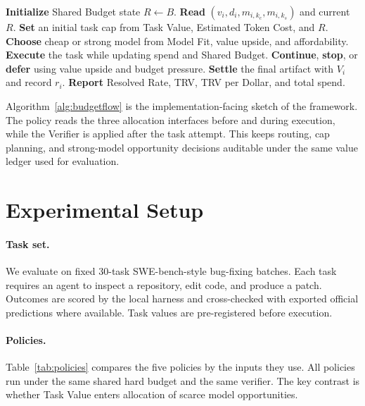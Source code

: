 \documentclass{article}
\newcommand{\trv}{TRV\xspace}
\newcommand{\taskvalue}{Task Value\xspace}
\newcommand{\tokencost}{Estimated Token Cost\xspace}
\newcommand{\modelfit}{Model Fit\xspace}
\newcommand{\sharedbudget}{Shared Budget\xspace}
\newcommand{\verifier}{Verifier\xspace}
\begin{document}
\begin{algorithm}[t]
\caption{BudgetFlow batch policy sketch}
\label{alg:budgetflow}
\begin{algorithmic}[1]
\STATE \textbf{Initialize} \sharedbudget state $R \leftarrow B$.
    \STATE \textbf{Read} $(v_i,d_i,m_{i,k_c},m_{i,k_s})$ and current $R$.
    \STATE \textbf{Set} an initial task cap from \taskvalue, \tokencost, and $R$.
    \STATE \textbf{Choose} cheap or strong model from \modelfit, value upside, and affordability.
    \STATE \textbf{Execute} the task while updating spend and \sharedbudget.
    \STATE \textbf{Continue}, \textbf{stop}, or \textbf{defer} using value upside and budget pressure.
    \STATE \textbf{Settle} the final artifact with $V_i$ and record $r_i$.
\ENDFOR
\STATE \textbf{Report} Resolved Rate, \trv, \trv per Dollar, and total spend.
\end{algorithmic}
\end{algorithm}

Algorithm~\ref{alg:budgetflow} is the implementation-facing sketch of the framework. The policy reads the three allocation interfaces before and during execution, while the \verifier is applied after the task attempt. This keeps routing, cap planning, and strong-model opportunity decisions auditable under the same value ledger used for evaluation.

\section{Experimental Setup}
\label{sec:setup}
\paragraph{Task set.}
We evaluate on fixed 30-task SWE-bench-style bug-fixing batches. Each task requires an agent to inspect a repository, edit code, and produce a patch. Outcomes are scored by the local harness and cross-checked with exported official predictions where available. Task values are pre-registered before execution.

\paragraph{Policies.}
Table~\ref{tab:policies} compares the five policies by the inputs they use. All policies run under the same shared hard budget and the same verifier. The key contrast is whether \taskvalue enters allocation of scarce model opportunities.
\end{document}
